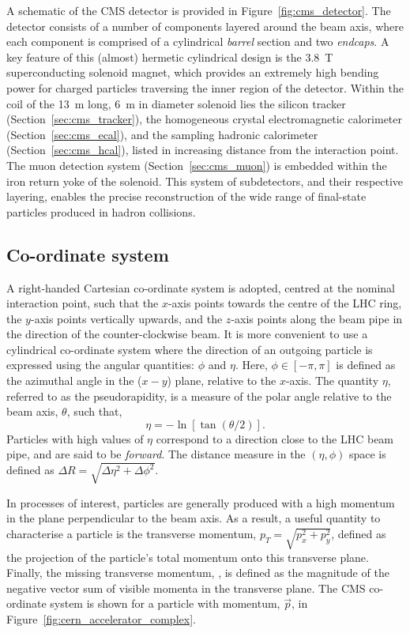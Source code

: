 A schematic of the CMS detector is provided in Figure~\ref{fig:cms_detector}. The detector consists of a number of components layered around the beam axis, where each component is comprised of a cylindrical \textit{barrel} section and two \textit{endcaps}. A key feature of this (almost) hermetic cylindrical design is the 3.8~T superconducting solenoid magnet, which provides an extremely high bending power for charged particles traversing the inner region of the detector. Within the coil of the 13~m long, 6~m in diameter solenoid lies the silicon tracker (Section~\ref{sec:cms_tracker}), the homogeneous crystal electromagnetic calorimeter (Section~\ref{sec:cms_ecal}), and the sampling hadronic calorimeter (Section~\ref{sec:cms_hcal}), listed in increasing distance from the interaction point. The muon detection system (Section~\ref{sec:cms_muon}) is embedded within the iron return yoke of the solenoid. This system of subdetectors, and their respective layering, enables the precise reconstruction of the wide range of final-state particles produced in hadron collisions.

\subsection{Co-ordinate system}
A right-handed Cartesian co-ordinate system is adopted, centred at the nominal interaction point, such that the $x$-axis points towards the centre of the LHC ring, the $y$-axis points vertically upwards, and the $z$-axis points along the beam pipe in the direction of the counter-clockwise beam. It is more convenient to use a cylindrical co-ordinate system where the direction of an outgoing particle is expressed using the angular quantities: $\phi$ and $\eta$. Here, $\phi \in [-\pi,\pi]$ is defined as the azimuthal angle in the ($x-y$) plane, relative to the $x$-axis. The quantity $\eta$, referred to as the pseudorapidity, is a measure of the polar angle relative to the beam axis, $\theta$, such that,
\begin{equation}
    \eta = - \ln[\tan(\theta/2)].
\end{equation}
Particles with high values of $\eta$ correspond to a direction close to the LHC beam pipe, and are said to be \textit{forward}. The distance measure in the $(\eta,\phi)$ space is defined as $\Delta R = \sqrt{\Delta\eta^2+\Delta\phi^2}$. 

In processes of interest, particles are generally produced with a high momentum in the plane perpendicular to the beam axis. As a result, a useful quantity to characterise a particle is the transverse momentum, $p_T = \sqrt{p_x^2+p_y^2}$, defined as the projection of the particle's total momentum onto this transverse plane. Finally, the missing transverse momentum, \met, is defined as the magnitude of the negative vector sum of visible momenta in the transverse plane. The CMS co-ordinate system is shown for a particle with momentum, $\vec{p}$, in Figure~\ref{fig:cern_accelerator_complex}.

